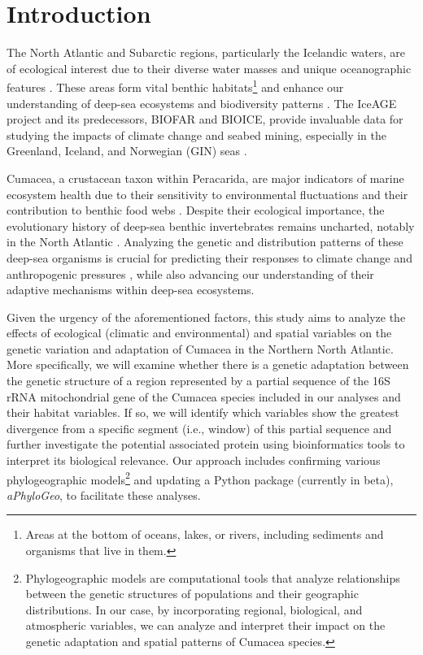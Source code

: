 \section{Introduction}\label{introduction}
The North Atlantic and Subarctic regions, particularly the Icelandic waters, are of ecological interest due to their diverse water masses and unique oceanographic features \citep{schnurr_composition_2014, meisner_benthic_2014, uhlir_adding_2021}. These areas form vital {benthic habitats}\footnote{Areas at the bottom of oceans, lakes, or rivers, including sediments and organisms that live in them.} \citep{levin2009ecological} and enhance our understanding of deep-sea ecosystems and biodiversity patterns \citep{rogers2007corals, danovaro2008exponential, uhlir_adding_2021}. The IceAGE project and its predecessors, BIOFAR and BIOICE, provide invaluable data for studying the impacts of climate change and seabed mining, especially in the Greenland, Iceland, and Norwegian (GIN) seas \citep{meisner_prefacebiodiversity_2018}.

Cumacea, a crustacean taxon within Peracarida, are major indicators of marine ecosystem health due to their sensitivity to environmental fluctuations \citep{stransky_diversity_2010} and their contribution to benthic food webs \citep{rehm2009cumacea}. Despite their ecological importance, the evolutionary history of deep-sea benthic invertebrates remains uncharted, notably in the North Atlantic \citep{jennings_phylogeographic_2014}. Analyzing the genetic and distribution patterns of these deep-sea organisms is crucial for predicting their responses to climate change \citep{jennings_phylogeographic_2014} and anthropogenic pressures \citep{meisner_prefacebiodiversity_2018}, while also advancing our understanding of their adaptive mechanisms within deep-sea ecosystems.

Given the urgency of the aforementioned factors, this study aims to analyze the effects of ecological (climatic and environmental) and spatial variables on the genetic variation and adaptation of Cumacea in the Northern North Atlantic. More specifically, we will examine whether there is a genetic adaptation between the genetic structure of a region represented by a partial sequence of the 16S rRNA mitochondrial gene of the Cumacea species included in our analyses and their habitat variables. If so, we will identify which variables show the greatest divergence from a specific segment (i.e., window) of this partial sequence and further investigate the potential associated protein using bioinformatics tools to interpret its biological relevance. Our approach includes confirming various phylogeographic models\footnote{Phylogeographic models are computational tools that analyze relationships between the genetic structures of populations and their geographic distributions. In our case, by incorporating regional, biological, and atmospheric variables, we can analyze and interpret their impact on the genetic adaptation and spatial patterns of Cumacea species.} and updating a Python package (currently in beta), \textit{aPhyloGeo}, to facilitate these analyses.

